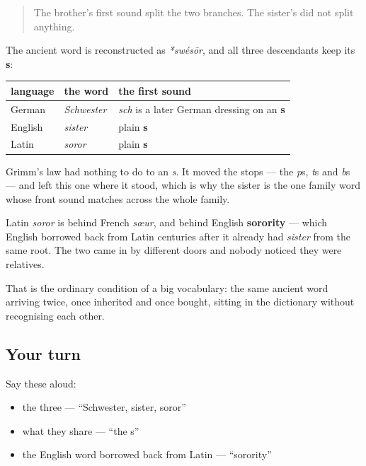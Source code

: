 \label{lesson:GE-C10-schwester-soror}



\begin{quote}
The brother's first sound split the two branches. The sister's did not split anything.
\end{quote}

\begin{cousinweb}
The ancient word is reconstructed as \emph{*swésōr}, and all three descendants keep its \textbf{s}:

\noindent
\begin{tabularx}{\linewidth}{@{}>{\raggedright\arraybackslash}X>{\raggedright\arraybackslash}X>{\raggedright\arraybackslash}X@{}}
\toprule
\textbf{language} & \textbf{the word} & \textbf{the first sound} \\
\midrule
German & \emph{Schwester} & \emph{sch} is a later German dressing on an \textbf{s} \\
English & \emph{sister} & plain \textbf{s} \\
Latin & \emph{soror} & plain \textbf{s} \\
\bottomrule
\end{tabularx}

Grimm's law had nothing to do to an \emph{s}. It moved the stops — the \emph{p}s, \emph{t}s and \emph{b}s — and left this one where it stood, which is why the sister is the one family word whose front sound matches across the whole family.
\end{cousinweb}

\begin{culture}
Latin \emph{soror} is behind French \emph{sœur}, and behind English \textbf{sorority} — which English borrowed back from Latin centuries after it already had \emph{sister} from the same root. The two came in by different doors and nobody noticed they were relatives.

That is the ordinary condition of a big vocabulary: the same ancient word arriving twice, once inherited and once bought, sitting in the dictionary without recognising each other.
\end{culture}

\subsection*{Your turn}
Say these aloud:

\begin{itemize}
\raggedright
  \item the three — \textquotedblleft{}Schwester, sister, soror\textquotedblright{}
  \item what they share — \textquotedblleft{}the s\textquotedblright{}
  \item the English word borrowed back from Latin — \textquotedblleft{}sorority\textquotedblright{}
\end{itemize}

